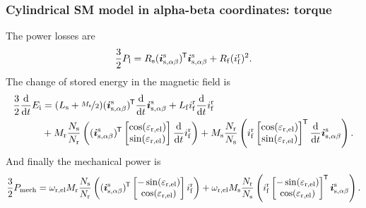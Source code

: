 \begin{frame}
	\frametitle{Cylindrical SM model in alpha-beta coordinates: torque}
	The power losses are
	\begin{equation*}
			\frac{3}{2}P_\mathrm{l} = R_\mathrm{s} (\bm{i}^\mathrm{s}_\mathrm{s,\alpha\beta})^{\mkern-1.5mu\mathsf{T}}\bm{i}^\mathrm{s}_\mathrm{s,\alpha\beta} + R_\mathrm{f} (i^\mathrm{r}_\mathrm{f})^2.
	\end{equation*}
	The change of stored energy in the magnetic field is
	\begin{align*}
		\frac{3}{2}\frac{\mathrm{d}}{\mathrm{d}t}E_\mathrm{i} &=  (L_\mathrm{s} +\nicefrac{M_\mathrm{s}}{2}) (\bm{i}^\mathrm{s}_\mathrm{s,\alpha\beta})^{\mkern-1.5mu\mathsf{T}}\frac{\mathrm{d}}{\mathrm{d}t}\bm{i}^\mathrm{s}_\mathrm{s,\alpha\beta} +  L_\mathrm{f} i^\mathrm{r}_\mathrm{f} \frac{\mathrm{d}}{\mathrm{d}t}i^\mathrm{r}_\mathrm{f} \\ &+ M_\mathrm{r}\frac{N_\mathrm{s}}{N_\mathrm{r}} \left((\bm{i}^\mathrm{s}_\mathrm{s,\alpha\beta})^{\mkern-1.5mu\mathsf{T}}\begin{bmatrix}\cos(\varepsilon_\mathrm{r,el})\\ \sin(\varepsilon_\mathrm{r,el})\end{bmatrix} \frac{\mathrm{d}}{\mathrm{d}t}i^\mathrm{r}_{\mathrm{f}}\right) + M_{\mathrm{s}}\frac{N_\mathrm{r}}{N_\mathrm{s}} \left(i^\mathrm{r}_\mathrm{f}\begin{bmatrix}\cos(\varepsilon_\mathrm{r,el})\\ \sin(\varepsilon_\mathrm{r,el})\end{bmatrix}^{\mkern-1.5mu\mathsf{T}} \frac{\mathrm{d}}{\mathrm{d}t} \bm{i}^\mathrm{s}_\mathrm{s,\alpha\beta}\right).
	\end{align*}
	And finally the mechanical power is
	\begin{equation*}
		\frac{3}{2}P_\mathrm{mech} = \omega_\mathrm{r,el}M_\mathrm{r}\frac{N_\mathrm{s}}{N_\mathrm{r}} \left((\bm{i}^\mathrm{s}_\mathrm{s,\alpha\beta})^{\mkern-1.5mu\mathsf{T}}\begin{bmatrix}-\sin(\varepsilon_\mathrm{r,el})\\ \cos(\varepsilon_\mathrm{r,el})\end{bmatrix}i^\mathrm{r}_{\mathrm{f}}\right) + \omega_\mathrm{r,el}M_{\mathrm{s}}\frac{N_\mathrm{r}}{N_\mathrm{s}} \left(i^\mathrm{r}_\mathrm{f} \begin{bmatrix}-\sin(\varepsilon_\mathrm{r,el})\\ \cos(\varepsilon_\mathrm{r,el})\end{bmatrix}^{\mkern-1.5mu\mathsf{T}} \bm{i}^\mathrm{s}_\mathrm{s,\alpha\beta}\right).
	\end{equation*}
\end{frame}